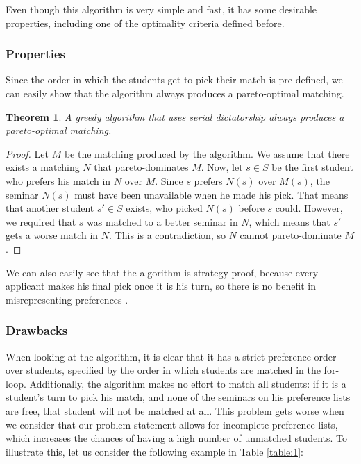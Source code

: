 Even though this algorithm is very simple and fast, it has some desirable properties, including one of the optimality criteria defined before.

\subsubsection{Properties}
Since the order in which the students get to pick their match is pre-defined, we can easily show that the algorithm always produces a pareto-optimal matching.
\newtheorem{theorem}{Theorem}
\begin{theorem}
    A greedy algorithm that uses serial dictatorship always produces a pareto-optimal matching.
\end{theorem}
\begin{proof}
    Let $M$ be the matching produced by the algorithm. We assume that there exists a matching $N$ that pareto-dominates $M$. Now, let $s\in S$ be the first student who prefers his match in $N$ over $M$. Since $s$ prefers $N(s)$ over $M(s)$, the seminar $N(s)$ must have been unavailable when he made his pick. That means that another student $s' \in S$ exists, who picked $N(s)$ before $s$ could. However, we required that $s$ was matched to a better seminar in $N$, which means that $s'$ gets a worse match in $N$. This is a contradiction, so $N$ cannot pareto-dominate $M$ \cite{kun_2015}.
\end{proof}

We can also easily see that the algorithm is strategy-proof, because every applicant makes his final pick once it is his turn, so there is no benefit in misrepresenting preferences \cite{Klaus}.

\subsubsection{Drawbacks}
When looking at the algorithm, it is clear that it has a strict preference order over students, specified by the order in which students are matched in the for-loop. Additionally, the algorithm makes no effort to match all students: if it is a student's turn to pick his match, and none of the seminars on his preference lists are free, that student will not be matched at all. This problem gets worse when we consider that our problem statement allows for incomplete preference lists, which increases the chances of having a high number of unmatched students. To illustrate this, let us consider the following example in Table \ref{table:1}:

